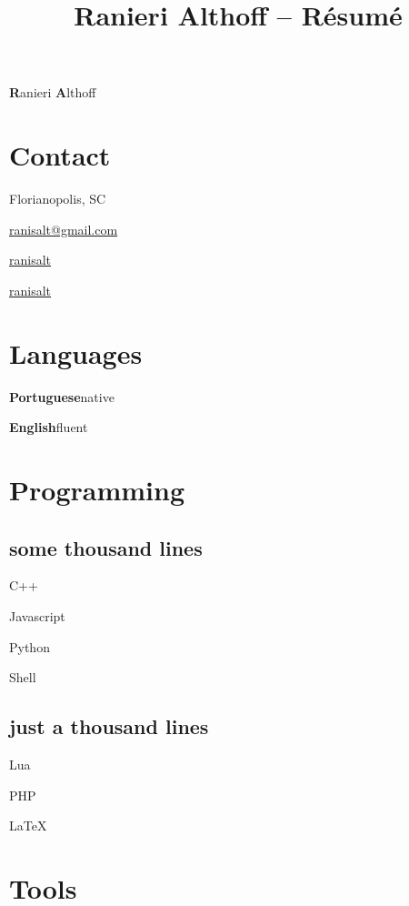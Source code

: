 \documentclass{article}
\def\emcolor{black}
\newcommand{\fgem}{\color{\emcolor}}%
\newcommand{\contactentry}[2]{%
	\parbox{\textwidth}{\hfill #2 \hspace{1em}\null}
}
\newcommand{\languageentry}[2]{%
	\parbox{\textwidth}{\hfill \textbf{#1}\hspace{1em}#2\hspace{1em}\null}
}
\newenvironment{aside}{%
\noindent
\begin{minipage}[t]{\dimexpr0.25\textwidth}%
\let\oldsection\section
\let\oldsubsection\subsection
\renewcommand{\section}[1]{\oldsection*{\fgem ##1}}
\renewcommand{\subsection}[1]{\oldsubsection*{\small ##1}\vspace{-0.5em}}
\begin{center}%
}{%
\end{center}%
\let\subsection\oldsubsection
\let\section\oldsection
\end{minipage}%
}
\begin{document}
 \selectfont

\title{Ranieri Althoff -- Résumé}

\hfill \Huge \textbf{R}anieri \textbf{A}lthoff
\normalsize \par
\vspace{\fill}

\begin{aside}
\section{Contact}
\contactentry{location}{Florianopolis, SC}
\contactentry{email}{\href{mailto:ranisalt+cv@gmail.com}{ranisalt@gmail.com}}
\contactentry{github}{\href{https://github.com/ranisalt}{ranisalt}}
\contactentry{twitter}{\href{https://twitter.com/ranisalt}{ranisalt}}


\section{Languages}
\languageentry{Portuguese}{native}
\languageentry{English}{fluent}


\section{Programming}
\subsection{some thousand lines}
\begin{itemize*}
\item{C++}
\item{Javascript}
\item{Python}
\item{Shell}
\end{itemize*}

\subsection{just a thousand lines}
\begin{itemize*}
\item{Lua}
\item{PHP}
\item{\LaTeX}
\end{itemize*}


\section{Tools}

\end{aside}
\end{document}
